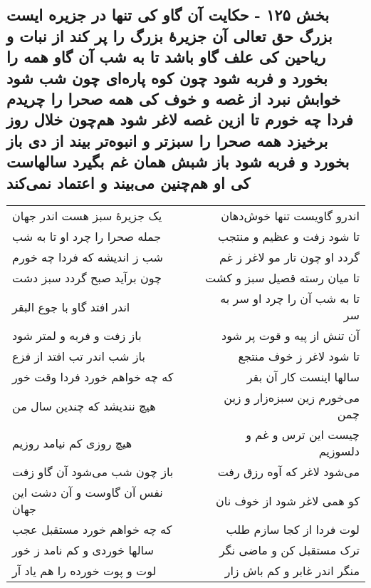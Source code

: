 \begin{center}
\section*{بخش ۱۲۵ - حکایت آن گاو کی تنها در جزیره ایست بزرگ حق تعالی آن جزیرهٔ بزرگ را پر کند از نبات و ریاحین کی علف گاو باشد تا به شب آن گاو همه را بخورد و فربه شود چون کوه پاره‌ای چون شب شود خوابش نبرد از غصه و خوف کی همه صحرا را چریدم فردا چه خورم تا ازین غصه لاغر شود هم‌چون خلال روز برخیزد  همه صحرا را سبزتر و انبوه‌تر بیند از دی باز بخورد و فربه شود باز شبش همان غم بگیرد سالهاست کی او هم‌چنین می‌بیند و اعتماد نمی‌کند}
\label{sec:sh125}
\begin{longtable}{l p{0.5cm} r}
یک جزیرهٔ سبز هست اندر جهان
&&
اندرو گاویست تنها خوش‌دهان
\\
جمله صحرا را چرد او تا به شب
&&
تا شود زفت و عظیم و منتجب
\\
شب ز اندیشه که فردا چه خورم
&&
گردد او چون تار مو لاغر ز غم
\\
چون برآید صبح گردد سبز دشت
&&
تا میان رسته قصیل سبز و کشت
\\
اندر افتد گاو با جوع البقر
&&
تا به شب آن را چرد او سر به سر
\\
باز زفت و فربه و لمتر شود
&&
آن تنش از پیه و قوت پر شود
\\
باز شب اندر تب افتد از فزع
&&
تا شود لاغر ز خوف منتجع
\\
که چه خواهم خورد فردا وقت خور
&&
سالها اینست کار آن بقر
\\
هیچ نندیشد که چندین سال من
&&
می‌خورم زین سبزه‌زار و زین چمن
\\
هیچ روزی کم نیامد روزیم
&&
چیست این ترس و غم و دلسوزیم
\\
باز چون شب می‌شود آن گاو زفت
&&
می‌شود لاغر که آوه رزق رفت
\\
نفس آن گاوست و آن دشت این جهان
&&
کو همی لاغر شود از خوف نان
\\
که چه خواهم خورد مستقبل عجب
&&
لوت فردا از کجا سازم طلب
\\
سالها خوردی و کم نامد ز خور
&&
ترک مستقبل کن و ماضی نگر
\\
لوت و پوت خورده را هم یاد آر
&&
منگر اندر غابر و کم باش زار
\\
\end{longtable}
\end{center}
